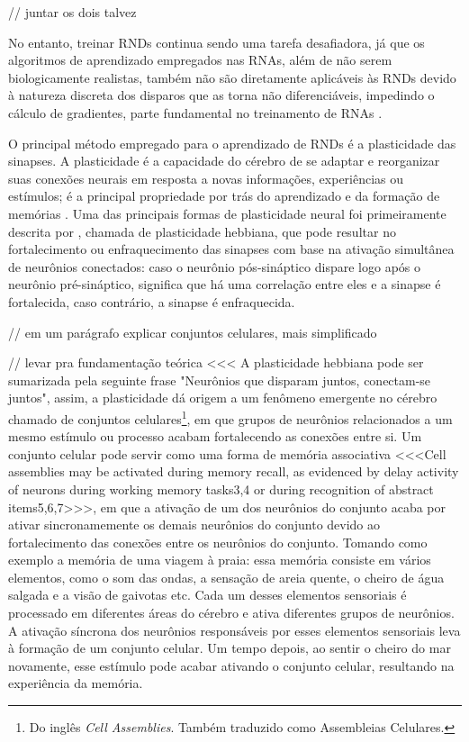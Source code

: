 // juntar os dois talvez

No entanto, treinar RNDs continua sendo uma tarefa desafiadora, já que os algoritmos de aprendizado empregados nas RNAs, além de
não serem biologicamente realistas, também não são diretamente aplicáveis às RNDs devido à natureza discreta dos disparos que as
torna não diferenciáveis, impedindo o cálculo de gradientes, parte fundamental no treinamento de RNAs \cite{}.

O principal método empregado para o aprendizado de RNDs é a plasticidade das sinapses. A plasticidade é a capacidade do cérebro de
se adaptar e reorganizar suas conexões neurais em resposta a novas informações, experiências ou estímulos; é a principal
propriedade por trás do aprendizado e da formação de memórias \cite{}. Uma das principais formas de plasticidade neural foi
primeiramente descrita por \cite{hebbOrganization1949}, chamada de plasticidade hebbiana, que pode resultar no fortalecimento ou
enfraquecimento das sinapses com base na ativação simultânea de neurônios conectados: caso o neurônio pós-sináptico dispare logo
após o neurônio pré-sináptico, significa que há uma correlação entre eles e a sinapse é fortalecida, caso contrário, a sinapse é
enfraquecida.

// em um parágrafo explicar conjuntos celulares, mais simplificado

// levar pra fundamentação teórica <<<
A plasticidade hebbiana pode ser sumarizada pela seguinte frase "Neurônios que disparam juntos, conectam-se juntos", assim, a
plasticidade dá origem a um fenômeno emergente no cérebro chamado de conjuntos celulares\footnote{Do inglês \textit{Cell
Assemblies}. Também traduzido como Assembleias Celulares.}, em que grupos de neurônios relacionados a um mesmo estímulo ou
processo acabam fortalecendo as conexões entre si. Um conjunto celular pode servir como uma forma de memória associativa
\cite{sakuraiMultiple2018} <<<Cell assemblies may be activated during memory recall, as evidenced by delay activity of neurons
during working memory tasks3,4 or during recognition of abstract items5,6,7>>>, em que a ativação de um dos neurônios do conjunto
acaba por ativar sincronamemente os demais neurônios do conjunto devido ao fortalecimento das conexões entre os neurônios do
conjunto. Tomando como exemplo a memória de uma viagem à praia: essa memória consiste em vários elementos, como o som das ondas, a
sensação de areia quente, o cheiro de água salgada e a visão de gaivotas etc. Cada um desses elementos sensoriais é processado em
diferentes áreas do cérebro e ativa diferentes grupos de neurônios. A ativação síncrona dos neurônios responsáveis por esses
elementos sensoriais leva à formação de um conjunto celular. Um tempo depois, ao sentir o cheiro do mar novamente, esse estímulo
pode acabar ativando o conjunto celular, resultando na experiência da memória.


